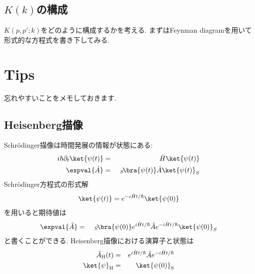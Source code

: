 \documentclass[10.5pt,a4paper]{jreport}
\begin{document}
\subsection{$K(k)$の構成}
$K(p, p';k)$をどのように構成するかを考える. まずはFeynman diagramを用いて形式的な方程式を書き下してみる.  


\section{Tips}
忘れやすいことをメモしておきます.
\subsection{Heisenberg描像}
Schr\"odinger描像は時間発展の情報が状態にある:
\begin{eqnarray}
  i\hbar\partial_t\ket{\psi(t)} &=& \hat{H}\ket{\psi(t)}\\
  \expval{\hat{A}} &=&\ _S\!\bra{\psi(t)}\hat{A}\ket{\psi(t)}_S
\end{eqnarray}
Schr\"odinger方程式の形式解
\begin{eqnarray}
  \ket{\psi(t)} = e^{-i\hat{H}t/\hbar}\ket{\psi(0)}
\end{eqnarray}
を用いると期待値は
\begin{eqnarray}
  \expval{\hat{A}} &=&\ _S\!\bra{\psi(0)}e^{i\hat{H}t/\hbar}\hat{A}e^{-i\hat{H}t/\hbar}\ket{\psi(0)}_S
\end{eqnarray}
と書くことができる. Heisenberg描像における演算子と状態は
\begin{eqnarray}
  \hat{A}_{\rm H}(t) &=& e^{i\hat{H}t/\hbar}\hat{A}e^{-i\hat{H}t/\hbar}\\
  \ket{\psi}_{\rm H} &=&  \ket{\psi(0)}_{\rm S}
\end{eqnarray}
\end{document}
